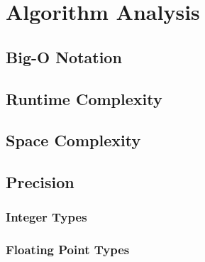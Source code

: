 \section{Algorithm Analysis}
\subsection{Big-O Notation}
\subsection{Runtime Complexity}
\subsection{Space Complexity}
\subsection{Precision}
\subsubsection{Integer Types}
\subsubsection{Floating Point Types}